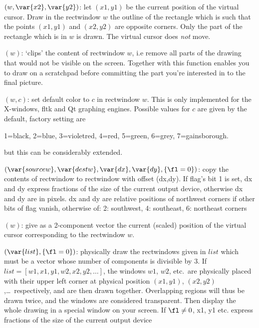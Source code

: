 $(w,\var{x2},\var{y2})$: \label{se:plotbox}let $(x1,y1)$ be the current position of the virtual cursor. Draw in the
rectwindow $w$ the outline of the rectangle which is such that the points
$(x1,y1)$ and $(x2,y2)$ are opposite corners. Only the part of the rectangle
which is in $w$ is drawn. The virtual cursor does \emph{not} move.

$(w)$: \label{se:plotclip}`clips' the content of rectwindow $w$, i.e remove all parts of the
drawing that would not be visible on the screen. Together with
 this function enables you to draw on a scratchpad before
committing the part you're interested in to the final picture.

$(w,c)$: \label{se:plotcolor}set default color to $c$ in rectwindow $w$.
This is only implemented for the X-windows, fltk and Qt graphing engines.
Possible values for $c$ are given by the  default,
factory setting are

1=black, 2=blue, 3=violetred, 4=red, 5=green, 6=grey, 7=gainsborough.

but this can be considerably extended.

$(\var{sourcew},\var{destw},\var{dx},\var{dy},\{\fl=0\})$: \label{se:plotcopy}copy the contents of rectwindow  to rectwindow 
with offset (dx,dy). If flag's bit 1 is set, dx and dy express fractions of
the size of the current output device, otherwise dx and dy are in pixels. dx
and dy are relative positions of northwest corners if other bits of flag
vanish, otherwise of: 2: southwest, 4: southeast, 6: northeast corners

$(w)$: \label{se:plotcursor}give as a 2-component vector the current
(scaled) position of the virtual cursor corresponding to the rectwindow $w$.

$(\var{list}, \{\fl=0\})$: \label{se:plotdraw}physically draw the rectwindows given in $list$
which must be a vector whose number of components is divisible by 3. If
$list=[w1,x1,y1,w2,x2,y2,\dots]$, the windows $w1$, $w2$, etc.~are
physically placed with their upper left corner at physical position
$(x1,y1)$, $(x2,y2)$,\dots\ respectively, and are then drawn together.
Overlapping regions will thus be drawn twice, and the windows are considered
transparent. Then display the whole drawing in a special window on your
screen. If $\fl \neq 0$, x1, y1 etc. express fractions of the size of the
current output device

